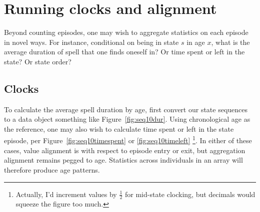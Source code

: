 \documentclass{article}
\begin{document}
\FloatBarrier
\section{Running clocks and alignment}
Beyond counting episodes, one may wish to aggregate statistics on each episode
in novel ways. For instance, conditional on being in state $s$ in age $x$, what
is the average duration of spell that one finds oneself in? Or time spent or
left in the state? Or state order?

\subsection{Clocks}
\label{sec:clocks}
To calculate the average spell duration by age, first convert our state
sequences to a data object something like Figure~\ref{fig:seq10dur}. Using chronological age as the reference, one may also wish to calculate time
spent or left in the state episode, per
Figure~\ref{fig:seq10timespent} or \ref{fig:seq10timeleft} \footnote{Actually,
I'd increment values by $\frac{1}{2}$ for mid-state clocking, but decimals would squeeze the figure too
much.}. In either of these cases, value alignment is with respect to episode
entry or exit, but aggregation alignment remains pegged to age. Statistics
across individuals in an array will therefore produce age patterns.
\end{document}
